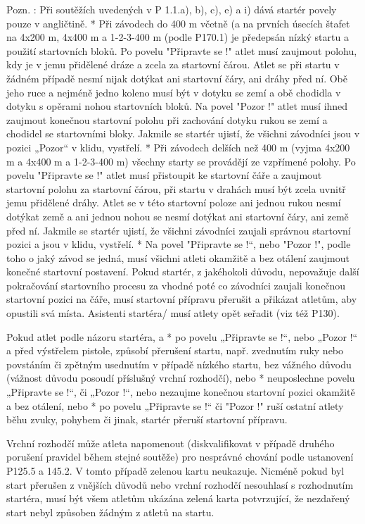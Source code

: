   Pozn. : Při soutěžích uvedených v P 1.1.a), b), c), e) a i) dává startér povely pouze v angličtině.
  \enditems
* Při závodech do 400 m včetně (a na prvních úsecích štafet na 4x200 m,  4x400 m a 1-2-3-400 m (podle P170.1) je předepsán nízký startu a použití startovních bloků. Po povelu "Připravte se !" atlet musí zaujmout polohu, kdy je v jemu přidělené dráze a zcela za startovní čárou. Atlet se při startu v žádném případě nesmí nijak dotýkat ani startovní čáry, ani dráhy před ní. Obě jeho ruce a nejméně jedno koleno musí být v dotyku se zemí a obě chodidla v dotyku s opěrami nohou startovních bloků. Na povel "Pozor !" atlet musí ihned zaujmout konečnou startovní polohu při zachování dotyku rukou se zemí a chodidel se startovními bloky. Jakmile se startér ujistí, že všichni závodníci jsou v pozici „Pozor“ v klidu, vystřelí.
* Při závodech delších než 400 m (vyjma  4x200 m a 4x400 m a 1-2-3-400 m) všechny starty se provádějí ze vzpřímené polohy. Po povelu  "Připravte se !" atlet musí přistoupit ke startovní čáře a zaujmout startovní polohu za startovní čárou, při startu v drahách musí být zcela uvnitř jemu přidělené dráhy. Atlet se v této startovní poloze ani jednou rukou nesmí dotýkat země a ani jednou nohou se nesmí dotýkat ani startovní čáry, ani země před ní. Jakmile se startér ujistí, že všichni závodníci zaujali správnou startovní pozici a jsou v klidu, vystřelí.
* Na povel "Připravte se !“, nebo "Pozor !", podle toho o jaký závod se jedná, musí všichni atleti okamžitě a bez otálení zaujmout konečné startovní postavení. Pokud startér, z jakéhokoli důvodu, nepovažuje další pokračování startovního procesu za vhodné poté co závodníci zaujali konečnou startovní pozici na čáře, musí startovní přípravu přerušit a přikázat atletům, aby opustili svá místa.  Asistenti startéra/ musí atlety opět seřadit (viz též P130).

Pokud atlet podle názoru startéra,
  \begitems \style a
  * po povelu „Připravte se !“, nebo „Pozor !“ a před výstřelem pistole, způsobí přerušení startu, např. zvednutím ruky nebo povstáním či zpětným usednutím v případě nízkého startu, bez vážného důvodu (vážnost důvodu posoudí příslušný vrchní rozhodčí), nebo
  * neuposlechne povelu „Připravte se !“, či „Pozor !“, nebo nezaujme konečnou startovní pozici okamžitě a bez otálení, nebo
  * po povelu „Připravte se !“ či "Pozor !" ruší ostatní atlety běhu zvuky, pohybem či jinak,
  \enditems
startér přeruší startovní přípravu.

Vrchní rozhodčí může atleta napomenout (diskvalifikovat v případě druhého porušení pravidel během stejné soutěže) pro nesprávné chování podle ustanovení P125.5 a 145.2. V tomto případě zelenou kartu neukazuje. Nicméně pokud byl start přerušen z vnějších důvodů nebo vrchní rozhodčí nesouhlasí s rozhodnutím startéra, musí být všem atletům ukázána zelená karta potvrzující, že nezdařený start nebyl způsoben žádným z atletů na startu.

